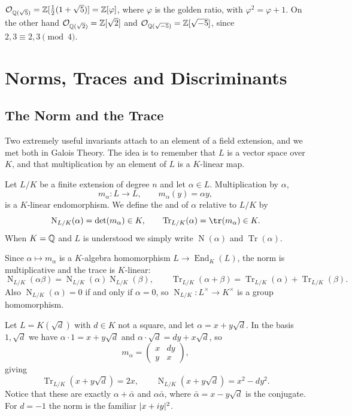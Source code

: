 \documentclass[a4paper]{scrartcl}
\renewcommand{\OO}{\mathcal{O}}
\newcommand{\Nm}{\operatorname{N}}
\newcommand{\Tr}{\operatorname{Tr}}
\begin{document}
\begin{example}
	$\OO_{\Q(\sqrt 5)} = \Z[\tfrac12(1+\sqrt5)] = \Z[\varphi]$, where $\varphi$ is the golden ratio, with $\varphi^2 = \varphi + 1$. On the other hand $\OO_{\Q(\sqrt 2)} = \Z[\sqrt2]$ and $\OO_{\Q(\sqrt{-5})} = \Z[\sqrt{-5}]$, since $2, 3 \equiv 2, 3 \pmod 4$.
\end{example}

\section{Norms, Traces and Discriminants}\label{sec:normtrace}

\subsection{The Norm and the Trace}

Two extremely useful invariants attach to an element of a field extension, and we met both in Galois Theory. The idea is to remember that $L$ is a vector space over $K$, and that multiplication by an element of $L$ is a $K$-linear map.

\begin{definition}
	Let $L/K$ be a finite extension of degree $n$ and let $\alpha \in L$. Multiplication by $\alpha$,
	$$m_\alpha : L \to L, \qquad m_\alpha(y) = \alpha y,$$
	is a $K$-linear endomorphism. We define the  and  of $\alpha$ relative to $L/K$ by
	$$\Nm_{L/K}(\alpha) = \det(m_\alpha) \in K, \qquad \Tr_{L/K}(\alpha) = \tr(m_\alpha) \in K.$$
	When $K = \mathbb{Q}$ and $L$ is understood we simply write $\Nm(\alpha)$ and $\Tr(\alpha)$.
\end{definition}

Since $\alpha \mapsto m_\alpha$ is a $K$-algebra homomorphism $L \to \operatorname{End}_K(L)$, the norm is multiplicative and the trace is $K$-linear:
$$\Nm_{L/K}(\alpha\beta) = \Nm_{L/K}(\alpha)\Nm_{L/K}(\beta), \qquad \Tr_{L/K}(\alpha+\beta) = \Tr_{L/K}(\alpha) + \Tr_{L/K}(\beta).$$
Also $\Nm_{L/K}(\alpha) = 0$ if and only if $\alpha = 0$, so $\Nm_{L/K} : L^\times \to K^\times$ is a group homomorphism.

\begin{example}\label{ex:quadnormtrace}
	Let $L = K(\sqrt d)$ with $d \in K$ not a square, and let $\alpha = x + y\sqrt d$. In the basis $1, \sqrt d$ we have $\alpha \cdot 1 = x + y \sqrt d$ and $\alpha \cdot \sqrt d = dy + x\sqrt d$, so
	$$m_\alpha = \begin{pmatrix} x & dy \\ y & x\end{pmatrix},$$
	giving
	$$\Tr_{L/K}(x + y\sqrt d) = 2x, \qquad \Nm_{L/K}(x+y\sqrt d) = x^2 - dy^2.$$
	Notice that these are exactly $\alpha + \bar\alpha$ and $\alpha\bar\alpha$, where $\bar\alpha = x - y\sqrt d$ is the conjugate. For $d = -1$ the norm is the familiar $\lvert x+iy\rvert^2$.
\end{example}
\end{document}
